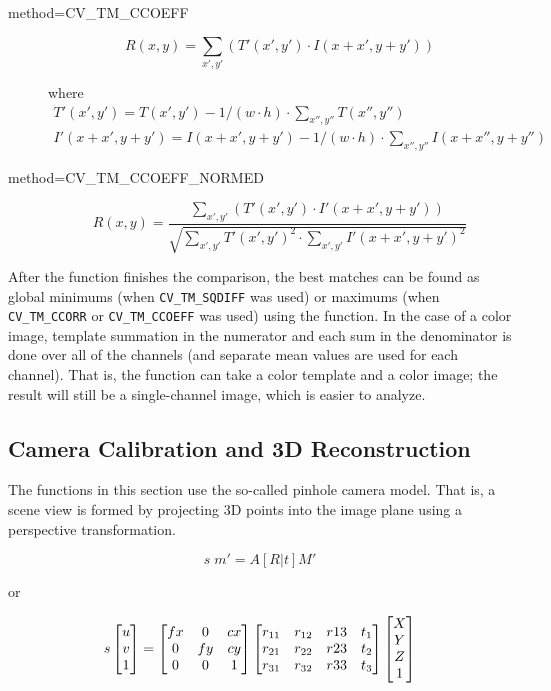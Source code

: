 \begin{description}
\begin{description}
\item[method=CV\_TM\_CCOEFF]
\[ R(x,y)=\sum_{x',y'} (T'(x',y') \cdot I(x+x',y+y')) \]

where
\[ 
\begin{array}{l}
T'(x',y')=T(x',y') - 1/(w \cdot h) \cdot \sum_{x'',y''} T(x'',y'')\\
I'(x+x',y+y')=I(x+x',y+y') - 1/(w \cdot h) \cdot \sum_{x'',y''} I(x+x'',y+y'')
\end{array}
\]

\item[method=CV\_TM\_CCOEFF\_NORMED]
\[ R(x,y)=\frac
{ \sum_{x',y'} (T'(x',y') \cdot I'(x+x',y+y')) }
{ \sqrt{\sum_{x',y'}T'(x',y')^2 \cdot \sum_{x',y'} I'(x+x',y+y')^2} }
\]
\end{description}

After the function finishes the comparison, the best matches can be found as global minimums (when \texttt{CV\_TM\_SQDIFF} was used) or maximums (when \texttt{CV\_TM\_CCORR} or \texttt{CV\_TM\_CCOEFF} was used) using the  function. In the case of a color image, template summation in the numerator and each sum in the denominator is done over all of the channels (and separate mean values are used for each channel). That is, the function can take a color template and a color image; the result will still be a single-channel image, which is easier to analyze.


\subsection{Camera Calibration and 3D Reconstruction}

The functions in this section use the so-called pinhole camera model. That
is, a scene view is formed by projecting 3D points into the image plane
using a perspective transformation.

\[
s \; m' = A [R|t] M'
\]

or

\[
s \begin{bmatrix} u\\ v\\ 1 \end{bmatrix} = \begin{bmatrix} fx & 0 & cx\\ 0 & fy & cy\\ 0 & 0 & 1 \end{bmatrix}
\begin{bmatrix}
 r_{11} & r_{12} & r{13} & t_1 \\
 r_{21} & r_{22} & r{23} & t_2 \\
 r_{31} & r_{32} & r{33} & t_3
\end{bmatrix}
\begin{bmatrix}X\\Y\\Z\\1 \end{bmatrix}
\]


\end{description}
